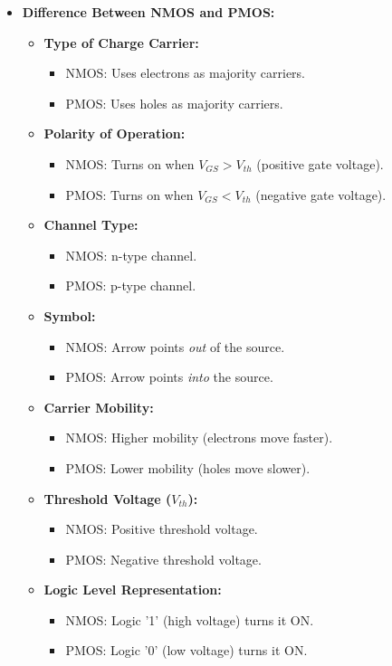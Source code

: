 \documentclass[a4paper,12pt]{article}
\begin{document}
\begin{itemize}
  \item \textbf{Difference Between NMOS and PMOS:}
  \begin{itemize}
    \item \textbf{Type of Charge Carrier:}
      \begin{itemize}
        \item NMOS: Uses electrons as majority carriers.
        \item PMOS: Uses holes as majority carriers.
      \end{itemize}

    \item \textbf{Polarity of Operation:}
      \begin{itemize}
        \item NMOS: Turns on when $V_{GS} > V_{th}$ (positive gate voltage).
        \item PMOS: Turns on when $V_{GS} < V_{th}$ (negative gate voltage).
      \end{itemize}

    \item \textbf{Channel Type:}
      \begin{itemize}
        \item NMOS: n-type channel.
        \item PMOS: p-type channel.
      \end{itemize}

    \item \textbf{Symbol:}
      \begin{itemize}
        \item NMOS: Arrow points \emph{out} of the source.
        \item PMOS: Arrow points \emph{into} the source.
      \end{itemize}

    \item \textbf{Carrier Mobility:}
      \begin{itemize}
        \item NMOS: Higher mobility (electrons move faster).
        \item PMOS: Lower mobility (holes move slower).
      \end{itemize}

    \item \textbf{Threshold Voltage ($V_{th}$):}
      \begin{itemize}
        \item NMOS: Positive threshold voltage.
        \item PMOS: Negative threshold voltage.
      \end{itemize}

    \item \textbf{Logic Level Representation:}
      \begin{itemize}
        \item NMOS: Logic '1' (high voltage) turns it ON.
        \item PMOS: Logic '0' (low voltage) turns it ON.
      \end{itemize}
  \end{itemize}
\end{itemize}
\end{document}
